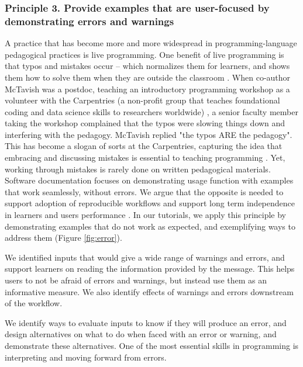 \documentclass[12pt]{article}
\begin{document}
\subsubsection*{Principle 3. Provide examples that are user-focused by demonstrating errors and warnings}


A practice that has become more and more widespread in programming-language pedagogical practices
is live programming.
One benefit of live programming is that typos and mistakes occur -- which normalizes
them for learners, and shows them how to solve them when they are outside the
classroom \citep{shannon2015live, nederbragt2020ten}.
When co-author McTavish was a postdoc, teaching an introductory programming workshop as a volunteer
with the Carpentries (a non-profit group that teaches foundational coding and
 data science skills to researchers worldwide) \citep{wilson2006swc, SWCwebsite},
a senior faculty member taking the workshop
complained that the typos were slowing things down and interfering with the pedagogy.
McTavish replied "the typos ARE the pedagogy".
This has become a slogan of sorts at the Carpentries, capturing the idea that embracing
and discussing mistakes is essential to teaching programming \citep{wilson2019teaching}.
Yet, working through mistakes is rarely done on written pedagogical materials.
Software documentation focuses on demonstrating usage function with examples that
work seamlessly, without errors. We argue that the opposite is needed to support
adoption of reproducible workflows and support long term independence in learners
and users performance
\citep{gaspar2007restoring, steele2014error}.
In our tutorials, we apply this principle by demonstrating examples that do not work
as expected, and exemplifying ways to address them (Figure \ref{fig:error}).

We identified inputs that would give
a wide range of warnings and errors, and support learners on reading the information
provided by the message. This
helps users to not be afraid of errors and warnings, but instead use them as
an informative measure.
We also identify effects of warnings and errors downstream of the workflow.

We identify ways to evaluate inputs to know if they will produce an error, and design
alternatives on what to do when faced with an error or warning, and demonstrate
these alternatives.
One of the most essential skills in programming is interpreting and moving forward
from errors.
\end{document}
